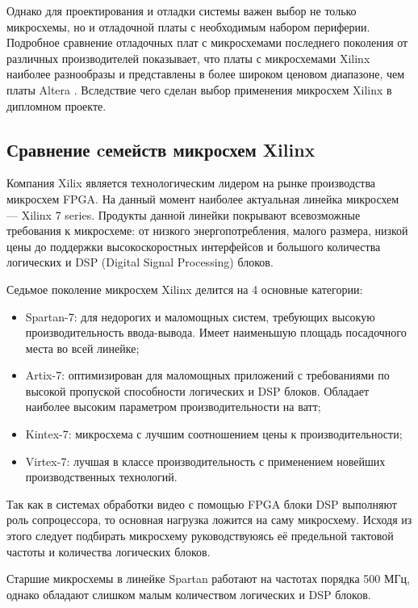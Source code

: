 Однако для проектирования и отладки системы важен выбор не только микросхемы,
но и отладочной платы с необходимым набором периферии. Подробное сравнение отладочных
плат с микросхемами последнего поколения от различных производителей показывает, что
платы с микросхемами Xilinx наиболее разнообразы и представлены в более широком ценовом диапазоне,
чем платы Altera \cite{fpga_boards_comparison}.
Вследствие чего сделан выбор применения микросхем Xilinx в дипломном проекте.

\subsection{Сравнение cемейств микросхем Xilinx}
\label{sub:domain:fpga_comparison}

Компания Xilix является технологическим лидером на рынке производства микросхем FPGA.
На данный момент наиболее актуальная линейка микросхем --- Xilinx 7 series\cite{7_series_overview}.
Продукты данной линейки покрывают всевозможные требования к микросхеме: от низкого энергопотребления, малого размера, низкой цены до
поддержки высокоскоростных интерфейсов и большого количества логических и DSP (Digital Signal Processing) блоков.

Седьмое поколение микросхем Xilinx делится на 4 основные категории:
\begin{itemize}
  \item Spartan-7: для недорогих и маломощных систем, требующих высокую производительность ввода-вывода.
    Имеет наименьшую площадь посадочного места во всей линейке;
  \item Artix-7: оптимизирован для маломощных приложений с требованиями по высокой пропуской способности логических и DSP блоков.
    Обладает наиболее высоким параметром производительности на ватт;
  \item Kintex-7: микросхема с лучшим соотношением цены к производительности;
  \item Virtex-7: лучшая в классе производительность с применением новейших производственных технологий.
\end{itemize}

Так как в системах обработки видео с помощью FPGA блоки DSP выполняют роль сопроцессора, то
основная нагрузка ложится на саму микросхему. Исходя из этого следует подбирать микросхему
руководствуюясь её предельной тактовой частоты и количества логических блоков\cite{7_series_selection_guide}.

Старшие микросхемы в линейке Spartan работают на частотах порядка 500 МГц, однако обладают слишком малым количеством
логических и DSP блоков.

